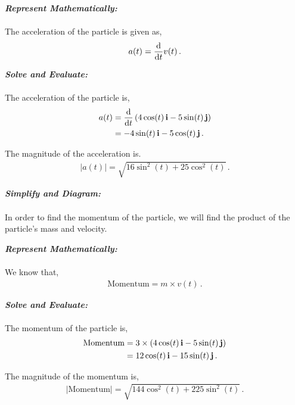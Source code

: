 \begin{subquestions}
\begin{subsubquestions}
\textbf{\textit{Represent Mathematically:}} \\ \\
The acceleration of the particle is given as,
\begin{equation}
	a(t) = \frac{\mathrm{d}}{\mathrm{d}t} v(t) \,.
\end{equation}




\textbf{\textit{Solve and Evaluate:}} \\ \\
The acceleration of the particle is,
\begin{align}
	a(t) & = \frac{\mathrm{d}}{\mathrm{d}t} \left(4\cos(t) \,\mathbf{i} -5\sin(t)\,\mathbf{j} \right) \nonumber \\
	& = -4\sin(t)\,\mathbf{i} - 5\cos(t)\,\mathbf{j} \,.
\end{align}

The magnitude of the acceleration is.
\begin{align}
	|a(t)| = \sqrt{16\sin^2(t)+25\cos^2(t)} \,. 
\end{align}


\subsubquestion

\textbf{\textit{Simplify and Diagram:}} \\ \\
In order to find the momentum of the particle, we will find the product of the particle's mass and velocity.




\textbf{\textit{Represent Mathematically:}} \\ \\
We know that,
\begin{align}
	\text{Momentum} = m \times v(t) \,.
\end{align}




\textbf{\textit{Solve and Evaluate:}} \\ \\
The momentum of the particle is,
\begin{align}
	\text{Momentum} & = 3 \times \left(4\cos(t) \,\mathbf{i} -5\sin(t) \,\mathbf{j}\right) \nonumber \\
	                & = 12\cos(t) \,\mathbf{i} - 15\sin(t)\,\mathbf{j} \,.
\end{align}

The magnitude of the momentum is,
\begin{align}
	|\text{Momentum}| = \sqrt{144\cos^2(t)+225\sin^2(t)} \,.	
\end{align}


\end{subsubquestions}
\end{subquestions}
